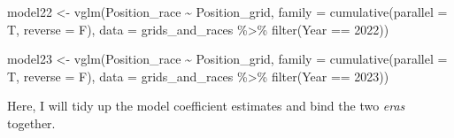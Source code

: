 \documentclass[
]{book}
\newenvironment{Shaded}{\begin{snugshade}}{\end{snugshade}}
\newcommand{\AttributeTok}[1]{\textcolor[rgb]{0.77,0.63,0.00}{#1}}
\newcommand{\CommentTok}[1]{\textcolor[rgb]{0.56,0.35,0.01}{\textit{#1}}}
\newcommand{\DecValTok}[1]{\textcolor[rgb]{0.00,0.00,0.81}{#1}}
\newcommand{\FunctionTok}[1]{\textcolor[rgb]{0.00,0.00,0.00}{#1}}
\newcommand{\NormalTok}[1]{#1}
\newcommand{\OtherTok}[1]{\textcolor[rgb]{0.56,0.35,0.01}{#1}}
\newcommand{\SpecialCharTok}[1]{\textcolor[rgb]{0.00,0.00,0.00}{#1}}
\newcommand{\StringTok}[1]{\textcolor[rgb]{0.31,0.60,0.02}{#1}}
\begin{document}
\begin{Shaded}
\begin{Highlighting}[]
\NormalTok{model22 }\OtherTok{\textless{}{-}} \FunctionTok{vglm}\NormalTok{(Position\_race }\SpecialCharTok{\textasciitilde{}}\NormalTok{ Position\_grid, }
                      \AttributeTok{family =} \FunctionTok{cumulative}\NormalTok{(}\AttributeTok{parallel =}\NormalTok{ T, }\AttributeTok{reverse =}\NormalTok{ F),}
                      \AttributeTok{data =}\NormalTok{ grids\_and\_races }\SpecialCharTok{\%\textgreater{}\%}
                       \FunctionTok{filter}\NormalTok{(Year }\SpecialCharTok{==} \DecValTok{2022}\NormalTok{))}

\NormalTok{model23 }\OtherTok{\textless{}{-}} \FunctionTok{vglm}\NormalTok{(Position\_race }\SpecialCharTok{\textasciitilde{}}\NormalTok{ Position\_grid, }
                      \AttributeTok{family =} \FunctionTok{cumulative}\NormalTok{(}\AttributeTok{parallel =}\NormalTok{ T, }\AttributeTok{reverse =}\NormalTok{ F),}
                      \AttributeTok{data =}\NormalTok{ grids\_and\_races }\SpecialCharTok{\%\textgreater{}\%}
                       \FunctionTok{filter}\NormalTok{(Year }\SpecialCharTok{==} \DecValTok{2023}\NormalTok{))}
\end{Highlighting}
\end{Shaded}

Here, I will tidy up the model coefficient estimates and bind the two \emph{eras} together.

\begin{Shaded}
\end{Shaded}
\end{document}
